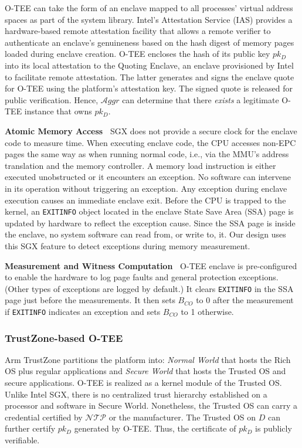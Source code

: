 \documentclass[letterpaper,twocolumn,10pt]{article}
\newcommand{\T}{\ensuremath{\mathcal{A}ggr}\xspace}
\newcommand{\N}{\ensuremath{\mathcal{N\!T}\mathcal{\!P}}\xspace}
\newcommand{\dn}{\ensuremath{D}\xspace}
\newcommand{\mypara}[1]{\vspace{.5em}\noindent\textbf{{#1}~}}
\begin{document}
O-TEE can take the form of an enclave mapped to all processes' virtual address spaces as part of the system library.
Intel's Attestation Service (IAS) provides a hardware-based remote attestation facility that allows a remote
verifier to authenticate an enclave's genuineness based on the
hash digest of memory pages loaded during enclave creation.
O-TEE encloses the hash of its public key $pk_D$ into its local attestation to the Quoting
Enclave, an enclave provisioned by Intel to facilitate remote attestation. The latter generates
and signs the enclave quote for O-TEE using the platform's attestation key. The signed quote
is released for public verification.
Hence, \T can determine that there \emph{exists} a legitimate O-TEE instance that owns $pk_D$.

\mypara{Atomic Memory Access} 
SGX does not provide a secure clock for the enclave code to measure time.
When executing enclave code, the CPU accesses non-EPC pages the same way as when running normal code,
i.e., via the MMU's address translation and the memory controller. A memory load
instruction is either executed unobstructed or it encounters an exception. No software can
intervene in its operation without triggering an exception.
Any exception during enclave execution causes an immediate enclave exit.
Before the CPU is trapped to the kernel, an \texttt{EXITINFO} object located in the enclave State
Save Area (SSA) page is updated by hardware to reflect the exception cause. Since the SSA page is
inside the enclave, no system software can read from, or write to, it. Our design uses
this SGX feature to detect exceptions during memory measurement.

\mypara{Measurement and Witness Computation} O-TEE enclave is pre-configured to enable the
hardware to log page faults and general protection exceptions. (Other types of exceptions are logged
by default.) It clears \texttt{EXITINFO} in the SSA page just before the measurements. It then sets
$B_{CO}$ to 0 after the measurement if \texttt{EXITINFO} indicates an exception and sets $B_{CO}$ to 1 otherwise.

\subsubsection{TrustZone-based O-TEE}
\label{sec:tz} 
Arm TrustZone partitions the platform into: {\it Normal World} that hosts the Rich OS plus regular
applications and {\it Secure World} that hosts the Trusted OS and secure applications.
O-TEE is realized as a kernel module of the Trusted OS. Unlike Intel SGX, there is no centralized
trust hierarchy established on a processor and software in Secure World. Nonetheless, the Trusted OS can
carry a credential certified by \N or the manufacturer. The Trusted OS on \dn can further certify
$pk_D$ generated by O-TEE. Thus, the certificate of $pk_D$ is publicly verifiable.
\end{document}
